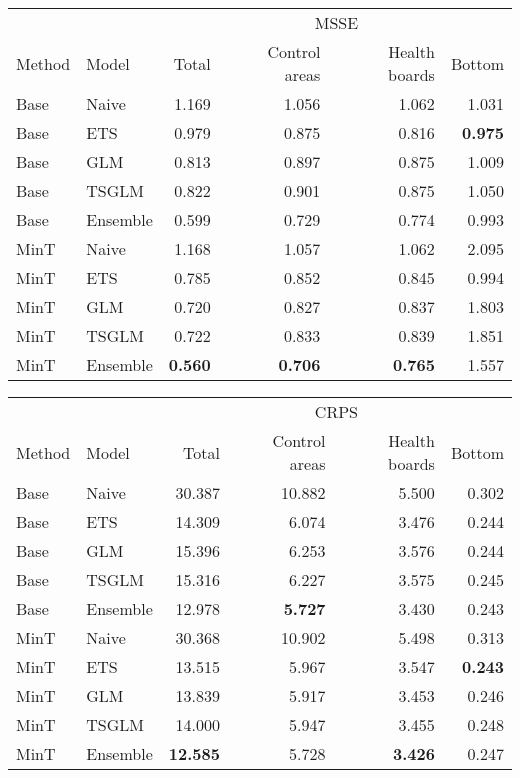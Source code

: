 \documentclass[
  authoryear,
  preprint,
  3p]{elsarticle}
\begin{document}
\begin{table}
\begin{minipage}[t]{\linewidth}
{\centering
\begin{tabular}[t]{llrrrr}
\toprule
\multicolumn{2}{c}{ } & \multicolumn{4}{c}{MSSE} \\
\cmidrule(l{3pt}r{3pt}){3-6}
Method & Model & Total & Control areas & Health boards & Bottom\\
\midrule
Base & Naive & 1.169 & 1.056 & 1.062 & 1.031\\
Base & ETS & 0.979 & 0.875 & 0.816 & \textbf{0.975}\\
Base & GLM & 0.813 & 0.897 & 0.875 & 1.009\\
Base & TSGLM & 0.822 & 0.901 & 0.875 & 1.050\\
Base & Ensemble & 0.599 & 0.729 & 0.774 & 0.993\\
\addlinespace
MinT & Naive & 1.168 & 1.057 & 1.062 & 2.095\\
MinT & ETS & 0.785 & 0.852 & 0.845 & 0.994\\
MinT & GLM & 0.720 & 0.827 & 0.837 & 1.803\\
MinT & TSGLM & 0.722 & 0.833 & 0.839 & 1.851\\
MinT & Ensemble & \textbf{0.560} & \textbf{0.706} & \textbf{0.765} & 1.557\\
\bottomrule
\end{tabular}

}

\end{minipage}%
\newline
\begin{minipage}[t]{\linewidth}

{\centering 

\tabularnewline

\centering
\begin{tabular}[t]{llrrrr}
\toprule
\multicolumn{2}{c}{ } & \multicolumn{4}{c}{CRPS} \\
\cmidrule(l{3pt}r{3pt}){3-6}
Method & Model & Total & Control areas & Health boards & Bottom\\
\midrule
Base & Naive & 30.387 & 10.882 & 5.500 & 0.302\\
Base & ETS & 14.309 & 6.074 & 3.476 & 0.244\\
Base & GLM & 15.396 & 6.253 & 3.576 & 0.244\\
Base & TSGLM & 15.316 & 6.227 & 3.575 & 0.245\\
Base & Ensemble & 12.978 & \textbf{5.727} & 3.430 & 0.243\\
\addlinespace
MinT & Naive & 30.368 & 10.902 & 5.498 & 0.313\\
MinT & ETS & 13.515 & 5.967 & 3.547 & \textbf{0.243}\\
MinT & GLM & 13.839 & 5.917 & 3.453 & 0.246\\
MinT & TSGLM & 14.000 & 5.947 & 3.455 & 0.248\\
MinT & Ensemble & \textbf{12.585} & 5.728 & \textbf{3.426} & 0.247\\
\bottomrule
\end{tabular}

}
\end{minipage}
\end{table}
\end{document}
